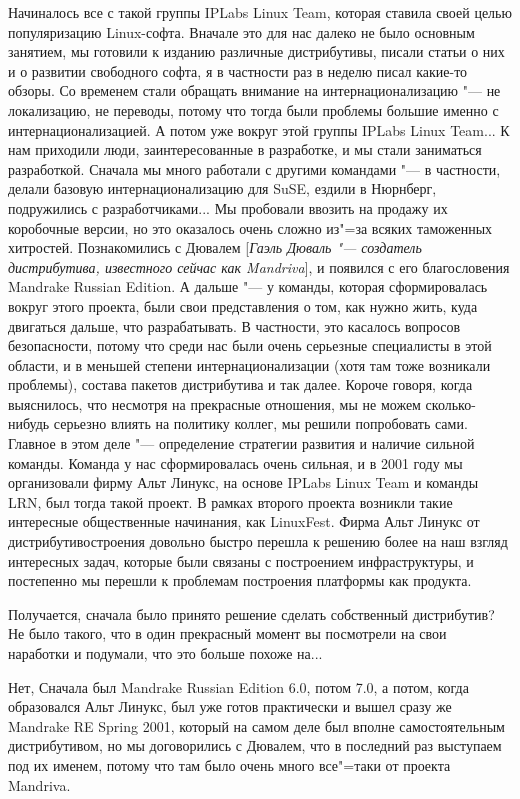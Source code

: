 \documentclass[10pt, a5paper]{article}
\begin{document}
\a Начиналось все с такой группы IPLabs Linux Team, которая ставила своей целью популяризацию Linux-софта. Вначале это для нас далеко не было основным занятием, мы готовили к изданию различные дистрибутивы, писали статьи о них и о развитии свободного софта, я в частности раз в неделю писал какие-то обзоры. Со временем стали обращать внимание на интернационализацию "--- не локализацию, не переводы, потому что тогда были проблемы большие именно с  интернационализацией. А потом уже вокруг этой группы  IPLabs Linux Team... К нам приходили люди, заинтересованные в разработке, и мы стали заниматься разработкой. Сначала мы много работали с другими командами "--- в частности, делали базовую интернационализацию для SuSE, ездили в Нюрнберг, подружились с разработчиками... Мы пробовали ввозить на продажу их коробочные версии, но это оказалось очень сложно из"=за всяких таможенных хитростей. Познакомились с Дювалем [\emph{Гаэль Дюваль "--- создатель дистрибутива, известного сейчас как Mandriva}], и появился с его благословения Mandrake Russian Edition. А дальше "--- у команды, которая сформировалась вокруг этого проекта, были свои представления о том, как нужно жить, куда двигаться дальше, что разрабатывать. В частности, это касалось вопросов безопасности, потому что среди нас были очень серьезные специалисты в этой области, и в меньшей степени интернационализации (хотя там тоже возникали проблемы),  состава пакетов дистрибутива и так далее. Короче говоря, когда выяснилось, что несмотря на прекрасные отношения, мы не можем сколько-нибудь серьезно влиять на политику коллег, мы решили попробовать сами. Главное в этом деле "--- определение стратегии развития и наличие сильной команды. Команда у нас сформировалась очень сильная, и в 2001 году мы организовали фирму Альт Линукс, на основе  IPLabs Linux Team и команды LRN, был тогда такой проект. В рамках второго проекта возникли такие интересные общественные начинания, как LinuxFest. Фирма Альт Линукс от дистрибутивостроения довольно быстро перешла к решению более на наш взгляд интересных задач, которые были связаны с построением инфраструктуры, и постепенно мы перешли к проблемам построения платформы как продукта. 

\q Получается, сначала было принято решение сделать собственный дистрибутив? Не было такого, что в один прекрасный момент вы посмотрели на свои наработки и подумали, что это больше похоже на...

\a Нет, Сначала был  Mandrake Russian Edition 6.0, потом 7.0, а потом, когда образовался Альт Линукс, был уже готов практически и вышел сразу же Mandrake RE Spring 2001, который на самом деле был вполне самостоятельным дистрибутивом, но мы договорились с Дювалем, что в последний раз выступаем под их именем, потому что там было очень много все"=таки от проекта Mandriva. 
\end{document}

